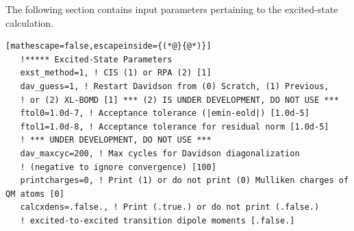 \documentclass[letterpaper,12pt,titlepage]{article}
\begin{document}
The following section contains input parameters pertaining to the excited-state calculation.
\begin{lstlisting}[mathescape=false,escapeinside={(*@}{@*)}]
   !***** Excited-State Parameters
   exst_method=1, ! CIS (1) or RPA (2) [1]
   dav_guess=1, ! Restart Davidson from (0) Scratch, (1) Previous, 
   ! or (2) XL-BOMD [1] *** (2) IS UNDER DEVELOPMENT, DO NOT USE ***
   ftol0=1.0d-7, ! Acceptance tolerance (|emin-eold|) [1.0d-5]
   ftol1=1.0d-8, ! Acceptance tolerance for residual norm [1.0d-5] 
   ! *** UNDER DEVELOPMENT, DO NOT USE ***
   dav_maxcyc=200, ! Max cycles for Davidson diagonalization 
   ! (negative to ignore convergence) [100]
   printcharges=0, ! Print (1) or do not print (0) Mulliken charges of QM atoms [0]
   calcxdens=.false., ! Print (.true.) or do not print (.false.) 
   ! excited-to-excited transition dipole moments [.false.]
\end{lstlisting}
\end{document}

